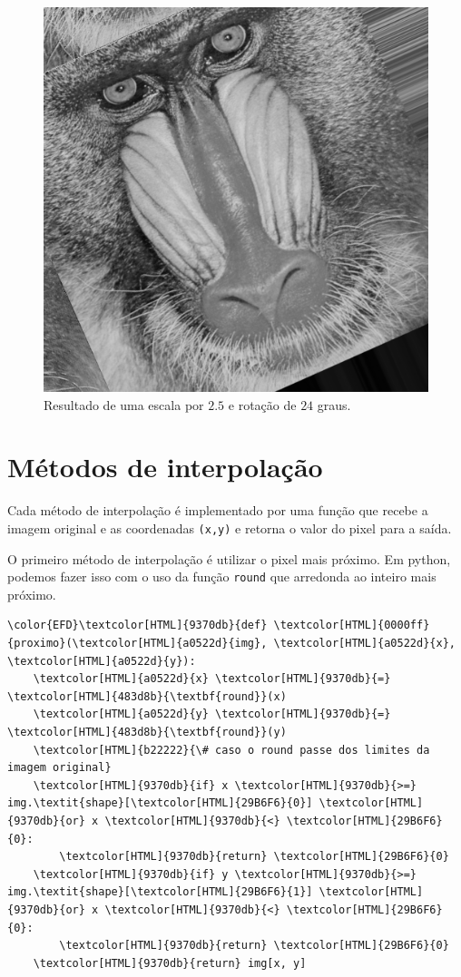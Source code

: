 \documentclass[11pt]{article}
\begin{document}
\begin{figure}[htbp]
\centering
\includegraphics[width=.9\linewidth]{./out/baboon_rotated.png}
\caption{Resultado de uma escala por \(2.5\) e rotação de \(24\) graus.}
\end{figure}

\section*{Métodos de interpolação}
\label{sec:org500544c}
Cada método de interpolação é implementado por uma função que recebe a imagem original e as coordenadas \texttt{(x,y)} e retorna o valor do pixel para a saída.

O primeiro método de interpolação é utilizar o pixel mais próximo.
Em python, podemos fazer isso com o uso da função \texttt{round} que arredonda ao inteiro mais próximo.
\begin{Code}
\begin{Verbatim}
\color{EFD}\textcolor[HTML]{9370db}{def} \textcolor[HTML]{0000ff}{proximo}(\textcolor[HTML]{a0522d}{img}, \textcolor[HTML]{a0522d}{x}, \textcolor[HTML]{a0522d}{y}):
    \textcolor[HTML]{a0522d}{x} \textcolor[HTML]{9370db}{=} \textcolor[HTML]{483d8b}{\textbf{round}}(x)
    \textcolor[HTML]{a0522d}{y} \textcolor[HTML]{9370db}{=} \textcolor[HTML]{483d8b}{\textbf{round}}(y)
    \textcolor[HTML]{b22222}{\# caso o round passe dos limites da imagem original}
    \textcolor[HTML]{9370db}{if} x \textcolor[HTML]{9370db}{>=} img.\textit{shape}[\textcolor[HTML]{29B6F6}{0}] \textcolor[HTML]{9370db}{or} x \textcolor[HTML]{9370db}{<} \textcolor[HTML]{29B6F6}{0}:
        \textcolor[HTML]{9370db}{return} \textcolor[HTML]{29B6F6}{0}
    \textcolor[HTML]{9370db}{if} y \textcolor[HTML]{9370db}{>=} img.\textit{shape}[\textcolor[HTML]{29B6F6}{1}] \textcolor[HTML]{9370db}{or} x \textcolor[HTML]{9370db}{<} \textcolor[HTML]{29B6F6}{0}:
        \textcolor[HTML]{9370db}{return} \textcolor[HTML]{29B6F6}{0}
    \textcolor[HTML]{9370db}{return} img[x, y]
\end{Verbatim}
\end{Code}
\end{document}
